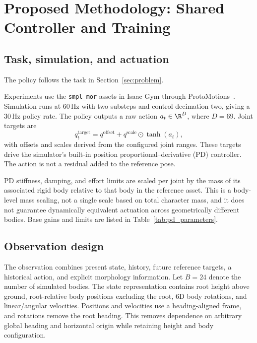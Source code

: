 \section{Proposed Methodology: Shared Controller and Training}\label{sec:method}

\subsection{Task, simulation, and actuation}

The policy follows the task in Section~\ref{sec:problem}.

Experiments use the \texttt{smpl\_mor} assets in Isaac Gym through
ProtoMotions~\cite{isaacgym,protomotions}. Simulation runs at 60\,Hz with two
substeps and control decimation two, giving a 30\,Hz policy rate. The policy
outputs a raw action $a_t\in\R^D$, where $D=69$. Joint targets are
\begin{equation}
    q_t^{\mathrm{target}}
      = q^{\mathrm{offset}}
        + q^{\mathrm{scale}}\odot\tanh(a_t),
    \label{eq:action_mapping}
\end{equation}
with offsets and scales derived from the configured joint ranges. These
targets drive the simulator's built-in position proportional--derivative (PD)
controller. The action is
not a residual added to the reference pose.

PD stiffness, damping, and effort limits are scaled per joint by the mass of
its associated rigid body relative to that body in the reference asset.
This is a body-level mass scaling, not a single scale based on total character
mass, and it does not guarantee dynamically equivalent actuation across
geometrically different bodies. Base gains and limits are listed in
Table~\ref{tab:pd_parameters}.

\subsection{Observation design}\label{sec:observations}

The observation combines present state, history, future reference targets,
a historical action, and explicit morphology information.
Let $B=24$ denote the number of simulated bodies. The state representation
contains root height above ground, root-relative body positions excluding
the root, 6D body rotations, and linear/angular velocities.
Positions and velocities use a heading-aligned frame, and rotations remove
the root heading. This removes dependence on arbitrary global heading and
horizontal origin while retaining height and body configuration.

